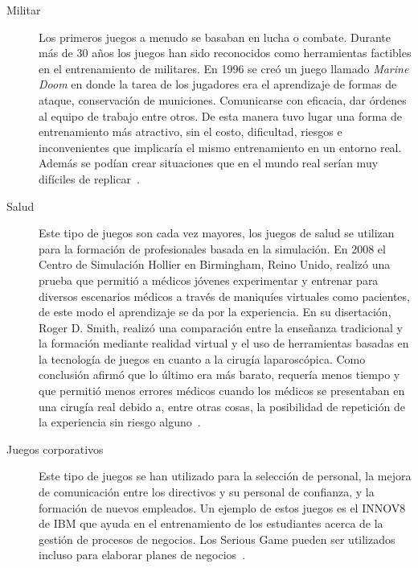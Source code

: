 \begin{description}

\item[Militar] Los primeros juegos a menudo se basaban en lucha o combate.
	Durante más de 30 años los juegos han sido reconocidos como herramientas
	factibles en el entrenamiento de militares. En 1996 se creó un juego
	llamado \emph{Marine Doom} en donde la tarea de los jugadores era el
	aprendizaje de formas de ataque, conservación de municiones. Comunicarse
	con eficacia, dar órdenes al equipo de trabajo entre otros. De esta
	manera tuvo lugar una forma de entrenamiento más atractivo, sin el
	costo, dificultad, riesgos e inconvenientes que implicaría el mismo
	entrenamiento en un entorno real. Además se podían crear situaciones que
	en el mundo real serían muy difíciles de
	replicar~\cite{education:games}.

\item[Salud] Este tipo de juegos son cada vez mayores, los juegos de salud se
	utilizan para la formación de profesionales basada en la simulación. En
	2008 el Centro de Simulación Hollier en Birmingham, Reino Unido, realizó
	una prueba que permitió a médicos jóvenes experimentar y entrenar para
	diversos escenarios médicos a través de maniquíes virtuales como
	pacientes, de este modo el aprendizaje se da por la experiencia. En su
	disertación, Roger D. Smith, realizó una comparación entre la enseñanza
	tradicional y la formación mediante realidad virtual y el uso de
	herramientas basadas en la tecnología de juegos en cuanto a la cirugía
	laparoscópica. Como conclusión afirmó que lo último era más barato,
	requería menos tiempo y que permitió menos errores médicos cuando los
	médicos se presentaban en una cirugía real debido a, entre otras cosas,
	la posibilidad de repetición de la experiencia sin riesgo
	alguno~\cite{education:games}.

\item[Juegos corporativos] Este tipo de juegos se han utilizado para la
	selección de personal, la mejora de comunicación entre los directivos y
	su personal de confianza, y la formación de nuevos empleados. Un ejemplo
	de estos juegos es el INNOV8 de IBM que ayuda en el entrenamiento de los
	estudiantes acerca de la gestión de procesos de negocios. Los Serious
	Game pueden ser utilizados incluso para elaborar planes de
	negocios~\cite{education:games}. 

\end{description}


